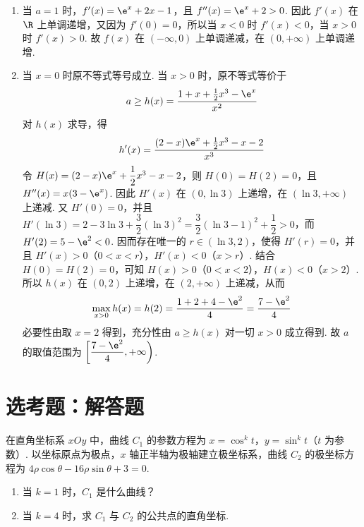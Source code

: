\begin{solution}
\begin{enumerate}
\item 当 \(a=1\) 时，\(f'(x)=\e^x+2x-1\)，且 \(f''(x)=\e^x+2>0\). 因此 \(f'(x)\) 在 \(\R\) 上单调递增，又因为 \(f'(0)=0\)，所以当 \(x<0\) 时 \(f'(x)<0\)，当 \(x>0\) 时 \(f'(x)>0\). 故 \(f(x)\) 在 \((-\infty,0)\) 上单调递减，在 \((0,+\infty)\) 上单调递增.

\item 当 \(x=0\) 时原不等式等号成立. 当 \(x>0\) 时，原不等式等价于
\[
a\ge h(x)=\frac{1+x+\frac{1}{2}x^3-\e^x}{x^2}
\]
对 \(h(x)\) 求导，得
\[
h'(x)=\frac{(2-x)\e^x+\frac{1}{2}x^3-x-2}{x^3}
\]
令 \(H(x)=(2-x)\e^x+\dfrac{1}{2}x^3-x-2\)，则 \(H(0)=H(2)=0\)，且
\(H''(x)=x(3-\e^x)\). 因此 \(H'(x)\) 在 \((0,\ln 3)\) 上递增，在 \((\ln 3,+\infty)\) 上递减. 又 \(H'(0)=0\)，并且
\(H'(\ln 3)=2-3\ln 3+\dfrac{3}{2}(\ln 3)^2=\dfrac{3}{2}(\ln 3-1)^2+\dfrac{1}{2}>0\)，而 \(H'(2)=5-\e^2<0\). 因而存在唯一的 \(r\in(\ln 3,2)\)，使得 \(H'(r)=0\)，并且 \(H'(x)>0\)（\(0<x<r\)），\(H'(x)<0\)（\(x>r\)）. 结合 \(H(0)=H(2)=0\)，可知 \(H(x)>0\)（\(0<x<2\)），\(H(x)<0\)（\(x>2\)）. 所以 \(h(x)\) 在 \((0,2)\) 上递增，在 \((2,+\infty)\) 上递减，从而
\[
\max_{x>0}h(x)=h(2)=\frac{1+2+4-\e^2}{4}=\frac{7-\e^2}{4}
\]
必要性由取 \(x=2\) 得到，充分性由 \(a\ge h(x)\) 对一切 \(x>0\) 成立得到. 故 \(a\) 的取值范围为 \(\left[\dfrac{7-\e^2}{4},+\infty\right)\).
\end{enumerate}
\end{solution}

\section{选考题：解答题}

\begin{problem}
在直角坐标系 \(xOy\) 中，曲线 \(C_1\) 的参数方程为 \(x=\cos^k t\)，\(y=\sin^k t\)（\(t\) 为参数）. 以坐标原点为极点，\(x\) 轴正半轴为极轴建立极坐标系，曲线 \(C_2\) 的极坐标方程为 \(4\rho\cos\theta-16\rho\sin\theta+3=0\).

\begin{enumerate}
\item 当 \(k=1\) 时，\(C_1\) 是什么曲线？

\item 当 \(k=4\) 时，求 \(C_1\) 与 \(C_2\) 的公共点的直角坐标.
\end{enumerate}
\end{problem}

